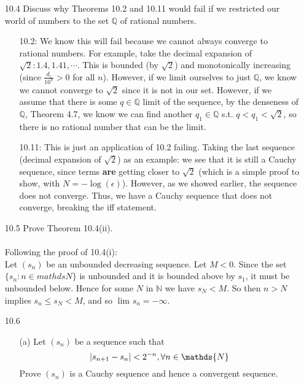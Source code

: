 \begin{itemize}
  \item [10.4]
    Discuss why Theorems 10.2 and 10.11 would fail if we restricted our world of numbers to the set $\mathds{Q}$ of rational numbers.
    \begin{itemize}
      \item [10.2:]
        We know this will fail because we cannot always converge to rational numbers. For example, take the decimal expansion of $\sqrt{2} : 1.4, 1.41, \cdots$. This is bounded (by $\sqrt{2}$) and monotonically increasing (since $\frac{d_i}{10^n} > 0$ for all $n$). However, if we limit ourselves to just $\mathds{Q}$, we know we cannot converge to $\sqrt{2}$ since it is not in our set. However, if we assume that there is some $q \in \mathds{Q}$ limit of the sequence, by the denseness of $\mathds{Q}$, Theorem 4.7, we know we can find another $q_1 \in \mathds{Q}$ s.t. $q < q_1 < \sqrt{2}$, so there is no rational number that can be the limit.\\

     \item [10.11:]
       This is just an application of 10.2 failing. Taking the last sequence (decimal expansion of $\sqrt{2}$) as an example: we see that it is still a Cauchy sequence, since terms \textbf{are} getting closer to $\sqrt{2}$ (which is a simple proof to show, with $N = -\log(\epsilon)$). However, as we showed earlier, the sequence does not converge. Thus, we have a Cauchy sequence that does not converge, breaking the iff statement.\\
    \end{itemize}
  \item [10.5]
    Prove Theorem 10.4(ii).\\\\
    Following the proof of 10.4(i):\\

    Let $(s_n)$ be an unbounded decreasing sequence. Let $M < 0$. Since the set $\{ s_n : n \in mathds{N} \}$ is unbounded and it is bounded above by $s_1$, it must be unbounded below. Hence for some $N$ in $\mathds{N}$ we have $s_N < M$. So then $n > N$ implies $s_n \leq s_N < M$, and so $\lim_{} s_n = - \infty$.\\

  \item [10.6]
    \begin{itemize}
      \item [(a)] Let $(s_n)$ be a sequence such that
        $$\abs{s_{n+1} - s_n} < 2^{-n}, \forall n \in \mathds{N}$$
        Prove $(s_n)$ is a Cauchy sequence and hence a convergent sequence.\\\\


\end{itemize}
\end{itemize}
